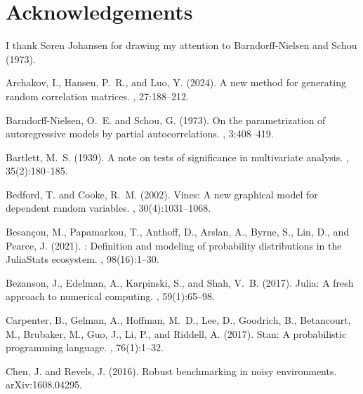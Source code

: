 \documentclass[12pt,english]{article}
\theoremstyle{plain} %
\theoremstyle{definition} %
\theoremstyle{remark} %
\begin{document}
\section*{Acknowledgements}

I thank S{\o}ren Johansen for drawing my attention to Barndorff-Nielsen and Schou (1973).

\begin{thebibliography}{}

Archakov, I., Hansen, P.~R., and Luo, Y. (2024).
\newblock A new method for generating random correlation matrices.
, 27:188--212.

Barndorff-Nielsen, O.~E. and Schou, G. (1973).
\newblock On the parametrization of autoregressive models by partial
  autocorrelations.
, 3:408--419.

Bartlett, M.~S. (1939).
\newblock A note on tests of significance in multivariate analysis.
, 35(2):180--185.

Bedford, T. and Cooke, R.~M. (2002).
\newblock Vines: A new graphical model for dependent random variables.
, 30(4):1031--1068.

Besan{\c{c}}on, M., Papamarkou, T., Anthoff, D., Arslan, A., Byrne, S., Lin,
  D., and Pearce, J. (2021).
: Definition and modeling of probability
  distributions in the {JuliaStats} ecosystem.
, 98(16):1--30.

Bezanson, J., Edelman, A., Karpinski, S., and Shah, V.~B. (2017).
\newblock Julia: A fresh approach to numerical computing.
, 59(1):65--98.

Carpenter, B., Gelman, A., Hoffman, M.~D., Lee, D., Goodrich, B., Betancourt,
  M., Brubaker, M., Guo, J., Li, P., and Riddell, A. (2017).
\newblock Stan: A probabilistic programming language.
, 76(1):1--32.

Chen, J. and Revels, J. (2016).
\newblock Robust benchmarking in noisy environments.
\newblock arXiv:1608.04295.


\end{thebibliography}
\end{document}
